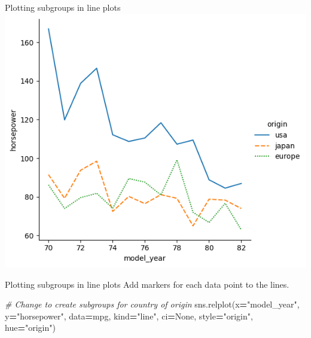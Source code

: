 \documentclass[
  ignorenonframetext,
]{beamer}
\newenvironment{Shaded}{\begin{snugshade}}{\end{snugshade}}
\newcommand{\CommentTok}[1]{\textcolor[rgb]{0.56,0.35,0.01}{\textit{#1}}}
\newcommand{\NormalTok}[1]{#1}
\newcommand{\OperatorTok}[1]{\textcolor[rgb]{0.81,0.36,0.00}{\textbf{#1}}}
\newcommand{\StringTok}[1]{\textcolor[rgb]{0.31,0.60,0.02}{#1}}
\newcommand{\VariableTok}[1]{\textcolor[rgb]{0.00,0.00,0.00}{#1}}
\begin{document}
\begin{frame}{Plotting subgroups in line plots}
\label{plotting-subgroups-in-line-plots-4}
\includegraphics{../images/im275.png}
\end{frame}

\begin{frame}[fragile]{Plotting subgroups in line plots}
\label{plotting-subgroups-in-line-plots-5}
Add markers for each data point to the lines.


\begin{Shaded}
\begin{Highlighting}[]
\CommentTok{\# Change to create subgroups for country of origin}
\NormalTok{sns.relplot(x}\OperatorTok{=}\StringTok{"model\_year"}\NormalTok{, y}\OperatorTok{=}\StringTok{"horsepower"}\NormalTok{, }
\NormalTok{            data}\OperatorTok{=}\NormalTok{mpg, kind}\OperatorTok{=}\StringTok{"line"}\NormalTok{, }
\NormalTok{            ci}\OperatorTok{=}\VariableTok{None}\NormalTok{, style}\OperatorTok{=}\StringTok{"origin"}\NormalTok{, }
\NormalTok{            hue}\OperatorTok{=}\StringTok{"origin"}\NormalTok{)}
\end{Highlighting}
\end{Shaded}
\end{frame}
\end{document}
